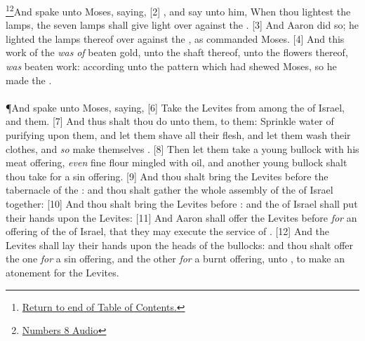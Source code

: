 \footnote{\textcolor[cmyk]{0.99998,1,0,0}{\hyperlink{TOC}{Return to end of Table of Contents.}}}\footnote{\href{https://audiobible.com/bible/numbers_8.html}{\textcolor[cmyk]{0.99998,1,0,0}{Numbers 8 Audio}}}\textcolor[cmyk]{0.99998,1,0,0}{And  spake unto Moses, saying,}
[2] \textcolor[cmyk]{0.99998,1,0,0}{, and say unto him, When thou lightest the lamps, the seven lamps shall give light over against the .}
[3] \textcolor[cmyk]{0.99998,1,0,0}{And Aaron did so; he lighted the lamps thereof over against the , as  commanded Moses.}
[4] \textcolor[cmyk]{0.99998,1,0,0}{And this work of the  \emph{was} \emph{of} beaten gold, unto the shaft thereof, unto the flowers thereof, \emph{was} beaten work: according unto the pattern which  had shewed Moses, so he made the .}\\
\\
\P \textcolor[cmyk]{0.99998,1,0,0}{And  spake unto Moses, saying,}
[6] \textcolor[cmyk]{0.99998,1,0,0}{Take the Levites from among the  of Israel, and  them.}
[7] \textcolor[cmyk]{0.99998,1,0,0}{And thus shalt thou do unto them, to  them: Sprinkle water of purifying upon them, and let them shave all their flesh, and let them wash their clothes, and \emph{so} make themselves .}
[8] \textcolor[cmyk]{0.99998,1,0,0}{Then let them take a young bullock with his meat offering, \emph{even} fine flour mingled with oil, and another young bullock shalt thou take for a sin offering.}
[9] \textcolor[cmyk]{0.99998,1,0,0}{And thou shalt bring the Levites before the tabernacle of the : and thou shalt gather the whole assembly of the  of Israel together:}
[10] \textcolor[cmyk]{0.99998,1,0,0}{And thou shalt bring the Levites before : and the  of Israel shall put their hands upon the Levites:}
[11] \textcolor[cmyk]{0.99998,1,0,0}{And Aaron shall offer the Levites before  \emph{for} an offering of the  of Israel, that they may execute the service of .}
[12] \textcolor[cmyk]{0.99998,1,0,0}{And the Levites shall lay their hands upon the heads of the bullocks: and thou shalt offer the one \emph{for} a sin offering, and the other \emph{for} a burnt offering, unto , to make an atonement for the Levites.}
